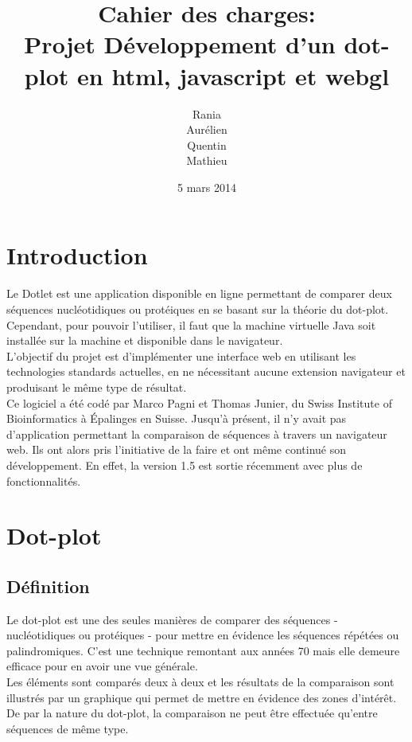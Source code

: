 \documentclass{report}
\title{Cahier des charges: \\Projet Développement d'un dot-plot en html, javascript et webgl }
\author{Rania \bsc{Assab} \\ Aurélien \bsc{Luciani}\\ Quentin \bsc{Riché-Piotaix}\\ Mathieu \bsc{Schaeffer}}
\date{5 mars 2014}
\begin{document}
\maketitle

\tableofcontents
{}

\chapter*{Introduction}

Le Dotlet est une application disponible en ligne permettant de comparer deux séquences nucléotidiques ou protéiques en se basant sur la théorie du dot-plot. Cependant, pour pouvoir l'utiliser, il faut que la machine virtuelle Java soit installée sur la machine et disponible dans le navigateur.\\
L'objectif du projet est d'implémenter une interface web en utilisant les technologies standards actuelles, en ne nécessitant aucune extension navigateur et produisant le même type de résultat.\\
Ce logiciel a été codé par Marco Pagni et Thomas Junier, du Swiss Institute of Bioinformatics à Épalinges en Suisse. Jusqu'à présent, il n'y avait pas d'application permettant la comparaison de séquences à travers un navigateur web. Ils ont alors pris l'initiative de la faire et ont même continué son développement. En effet, la version 1.5 est sortie récemment avec plus de fonctionnalités.\\

\chapter{Dot-plot}

\section{Définition}

Le dot-plot est une des seules manières de comparer des séquences - nucléotidiques ou protéiques - pour mettre en évidence les séquences répétées ou palindromiques. C'est une technique remontant aux années 70 mais elle demeure efficace pour en avoir une vue générale.\\
Les éléments sont comparés deux à deux et les résultats de la comparaison sont illustrés par un graphique qui permet de mettre en évidence des zones d'intérêt.\\
De par la nature du dot-plot, la comparaison ne peut être effectuée qu'entre séquences de même type.\\
\end{document}
